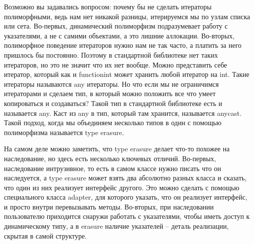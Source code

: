 \documentclass[12pt, a4paper]{article}
\begin{document}
	Возможно вы задавались вопросом: почему бы не сделать итераторы полиморфными, ведь нам нет никакой разницы, итерируемся мы по узлам списка или сета. Во-первых, динамический полиморфизм подразумевает работу с указателями, а не с самими объектами, а это лишние аллокации. Во-вторых, полиморфное поведение итераторов нужно нам не так часто, а платить за него пришлось бы постоянно. Поэтому в стандартной библиотеке нет таких итераторов, но это не значит что их нет вообще. Можно представить себе итератор, который как и function\textunderscore int может хранить любой итератор на int. Такие итераторы называются any итераторы. Но что если мы не ограничимся итераторами и сделаем тип, в который можно положить все что умеет копироваться и создаваться? Такой тип в стандартной библиотеке есть и называется any. Каст из any в тип, который там хранится, называется any\textunderscore cast. Такой подход, когда мы объединяем несколько типов в один с помощью полиморфизма называется type erasure.
	\par На самом деле можно заметить, что type erasure делает что-то похожее на наследование, но здесь есть несколько ключевых отличий. Во-первых, наследование интрузивное, то есть в самом классе нужно писать что он наследуется, а type erasure может взять два абсолютно разных класса и сказать, что один из них реализует интерфейс другого. Это можно сделать с помощью специального класса adapter, для которого указать, что он реализует интерфейс, и просто внутри перевызывать методы. Во-вторых, при наследовании пользователю приходится снаружи работать с указателями, чтобы иметь доступ к динамическому типу, а в erasure наличие указателей -- деталь реализации, скрытая в самой структуре.
\end{document}
